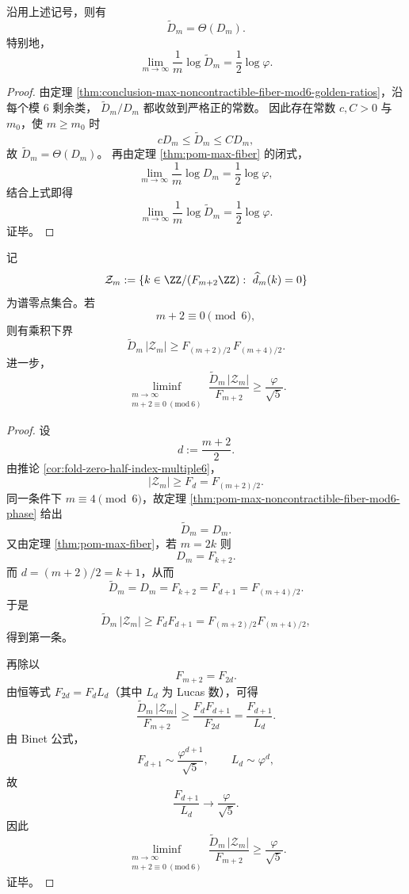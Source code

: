 \begin{corollary}[非可缩最大纤维的指数率守恒]\label{cor:conclusion-max-noncontractible-fiber-exponential-rate}
沿用上述记号，则有
\[
\boxed{\;
\widetilde D_m=\Theta(D_m).\;}
\]
特别地，
\[
\boxed{\;
\lim_{m\to\infty}\frac1m\log \widetilde D_m
=
\frac12\log\varphi.\;}
\]
\end{corollary}
\begin{proof}
由定理 \ref{thm:conclusion-max-noncontractible-fiber-mod6-golden-ratios}，沿每个模 \(6\) 剩余类，
\(
\widetilde D_m/D_m
\)
都收敛到严格正的常数。
因此存在常数 \(c,C>0\) 与 \(m_0\)，使 \(m\ge m_0\) 时
\[
cD_m\le \widetilde D_m\le CD_m,
\]
故 \(\widetilde D_m=\Theta(D_m)\)。
再由定理 \ref{thm:pom-max-fiber} 的闭式，
\[
\lim_{m\to\infty}\frac1m\log D_m=\frac12\log\varphi,
\]
结合上式即得
\[
\lim_{m\to\infty}\frac1m\log \widetilde D_m=\frac12\log\varphi.
\]
证毕。
\end{proof}




\begin{theorem}\label{thm:conclusion-window6-spectral-topological-golden-product}
记
\[
\mathcal Z_m:=\{k\in \ZZ/(F_{m+2}\ZZ):\ \widehat d_m(k)=0\}
\]
为谱零点集合。若
\[
m+2\equiv 0\pmod 6,
\]
则有乘积下界
\[
\boxed{\;
\widetilde D_m\,|\mathcal Z_m|
\ge
F_{(m+2)/2}\,F_{(m+4)/2}.\;}
\]
进一步，
\[
\boxed{\;
\liminf_{\substack{m\to\infty\\ m+2\equiv 0\ (\mathrm{mod}\ 6)}}
\frac{\widetilde D_m\,|\mathcal Z_m|}{F_{m+2}}
\ge
\frac{\varphi}{\sqrt5}.\;}
\]
\end{theorem}
\begin{proof}
设
\[
d:=\frac{m+2}{2}.
\]
由推论 \ref{cor:fold-zero-half-index-multiple6}，
\[
|\mathcal Z_m|\ge F_d=F_{(m+2)/2}.
\]
同一条件下 \(m\equiv 4\pmod 6\)，故定理 \ref{thm:pom-max-noncontractible-fiber-mod6-phase} 给出
\[
\widetilde D_m=D_m.
\]
又由定理 \ref{thm:pom-max-fiber}，若 \(m=2k\) 则
\[
D_m=F_{k+2}.
\]
而 \(d=(m+2)/2=k+1\)，从而
\[
\widetilde D_m=D_m=F_{k+2}=F_{d+1}=F_{(m+4)/2}.
\]
于是
\[
\widetilde D_m\,|\mathcal Z_m|
\ge
F_dF_{d+1}
=
F_{(m+2)/2}F_{(m+4)/2},
\]
得到第一条。

再除以
\[
F_{m+2}=F_{2d}.
\]
由恒等式 \(F_{2d}=F_dL_d\)（其中 \(L_d\) 为 Lucas 数），可得
\[
\frac{\widetilde D_m\,|\mathcal Z_m|}{F_{m+2}}
\ge
\frac{F_dF_{d+1}}{F_{2d}}
=
\frac{F_{d+1}}{L_d}.
\]
由 Binet 公式，
\[
F_{d+1}\sim \frac{\varphi^{d+1}}{\sqrt5},
\qquad
L_d\sim \varphi^d,
\]
故
\[
\frac{F_{d+1}}{L_d}\longrightarrow \frac{\varphi}{\sqrt5}.
\]
因此
\[
\liminf_{\substack{m\to\infty\\ m+2\equiv 0\ (\mathrm{mod}\ 6)}}
\frac{\widetilde D_m\,|\mathcal Z_m|}{F_{m+2}}
\ge
\frac{\varphi}{\sqrt5}.
\]
证毕。
\end{proof}

